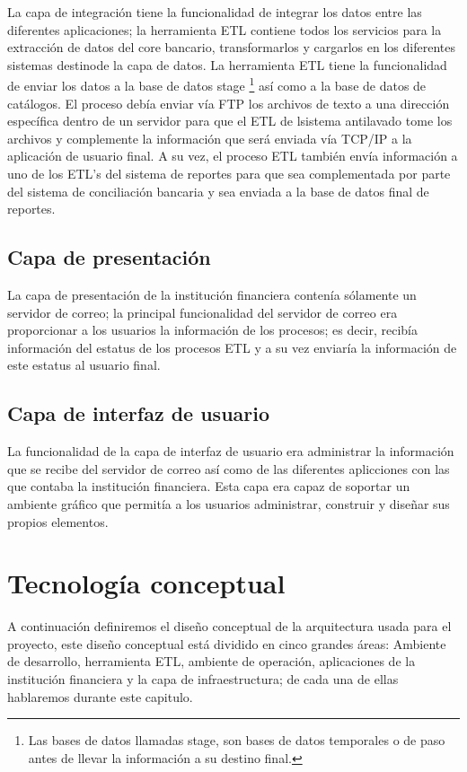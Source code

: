 \documentclass[a4paper,openright,12pt]{book}
\begin{document}
La capa de integración tiene la funcionalidad de integrar los datos entre las
diferentes aplicaciones; la herramienta ETL contiene todos los servicios para la
extracción de datos del core bancario, transformarlos y cargarlos en los
diferentes sistemas destinode la capa de datos. La herramienta ETL tiene la
funcionalidad de enviar los datos a la base de datos stage \footnote{Las bases
  de datos llamadas stage, son bases de datos temporales o de paso antes de
  llevar la información a su destino final.} así como a la base de datos de
catálogos. El proceso debía enviar vía FTP los archivos de texto a una dirección
específica dentro de un servidor para que el ETL de lsistema antilavado tome los
archivos y complemente la información que será enviada vía TCP/IP a la
aplicación de usuario final. A su vez, el proceso ETL también envía información
a uno de los ETL's del sistema de reportes para que sea complementada por parte
del sistema de conciliación bancaria y sea enviada a la base de datos final de
reportes.

\subsection{Capa de presentación}

La capa de presentación de la institución financiera contenía sólamente un
servidor de correo; la principal funcionalidad del servidor de correo era
proporcionar a los usuarios la información de los procesos; es decir, recibía
información del estatus de los procesos ETL y a su vez enviaría la información
de este estatus al usuario final.

\subsection{Capa de interfaz de usuario}

La funcionalidad de la capa de interfaz de usuario era administrar la
información que se recibe del servidor de correo así como de las diferentes
aplicciones con las que contaba la institución financiera. Esta capa era capaz
de soportar un ambiente gráfico que permitía a los usuarios administrar,
construir y diseñar sus propios elementos.

\section{Tecnología conceptual}

A continuación definiremos el diseño conceptual de la arquitectura usada para el
proyecto, este diseño conceptual está dividido en cinco grandes áreas: Ambiente
de desarrollo, herramienta ETL, ambiente de operación, aplicaciones de la
institución financiera y la capa de infraestructura; de cada una de ellas
hablaremos durante este capitulo.
\end{document}
